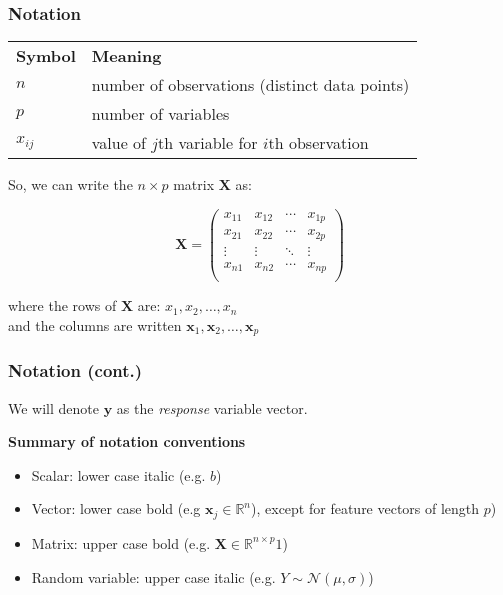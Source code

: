 \documentclass[usenames,dvipsnames,smaller]{beamer}
\newcommand{\?}{\stackrel{?}{=}}
\begin{document}
\begin{frame}
  \frametitle{Notation}

  \begin{tabular}[t]{l l}
    \bf Symbol & \bf Meaning \\ \pause
    $n$ & number of observations (distinct data points) \\\pause
    $p$ & number of variables \\\pause
    $x_{ij}$ & value of $j$th variable for $i$th observation \\
  \end{tabular}

  \pause

  \bigskip
   
  So, we can write the $n\times p$ matrix $\bm X$ as:

  \begin{equation*}
    \bm{X} =
    \begin{pmatrix}
      x_{11} & x_{12} & \cdots & x_{1p} \\
      x_{21} & x_{22} & \cdots & x_{2p} \\
      \vdots & \vdots & \ddots & \vdots \\
      x_{n1} & x_{n2} & \cdots & x_{np} \\
    \end{pmatrix}
  \end{equation*}
  \pause

  where the rows of $\bm X$ are: $x_1, x_2, \ldots, x_n$ \\ \pause and the columns are written $\bm x_1, \bm x_2, \ldots, \bm x_p$
\end{frame}

\begin{frame}
  \frametitle{Notation (cont.)}
  We will denote $\bm y$ as the \textit{response} variable vector.

  \pause
  \bigskip
  

  {\bf Summary of notation conventions}

  \begin{itemize}
  \item Scalar: lower case italic (e.g. $b$)
  \item Vector: lower case bold (e.g $\bm x_j \in \mathbb{R}^n$), except for feature vectors of length $p$)
  \item Matrix: upper case bold (e.g. $\bm X \in \mathbb{R}^{n\times p}1$)
  \item Random variable: upper case italic (e.g. $Y\sim \mathcal{N}(\mu,\sigma)$)
  \end{itemize}
  
\end{frame}
\end{document}
